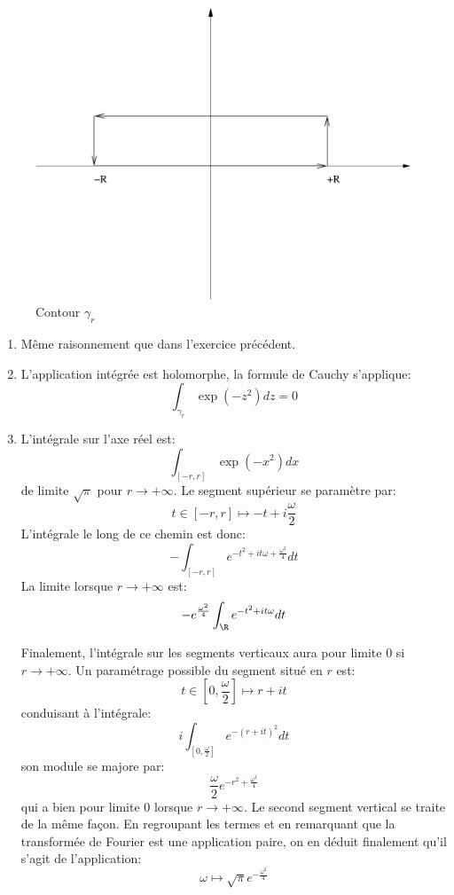  \begin{figure}[ht]
\includegraphics[scale=0.3]{contour_gauss.pdf}
\caption{Contour $\gamma_r$}\label{fig:contour3}
\end{figure}
\begin{enumerate}
 \item Même raisonnement que dans l'exercice précédent.
\item L'application intégrée est holomorphe, la formule de Cauchy s'applique:
\[
  \int_{\gamma_r} \exp(-z^2)dz = 0
  \]
\item L'intégrale sur l'axe réel est:
\[
 \int_{[-r,r]} \exp(-x^2) dx 
\]
de limite $\sqrt{\pi}$ pour $r \to +\infty$. Le segment supérieur se paramètre
par:
\[
 t \in [-r,r] \mapsto -t+i \frac{\omega}{2}
\]
L'intégrale le long de ce chemin est donc:
\[
 - \int_{[-r,r]} e^{-t^2 + i t \omega + \frac{\omega^2}{4}} dt
\]
La limite lorsque $r\to +\infty$ est:
\[
- e^{\frac{\omega^2}{4}} \int_\R  e^{-t^2 + i t \omega} dt 
\]

Finalement, l'intégrale sur les segments verticaux aura pour limite $0$ si $r
\to +\infty$. Un paramétrage possible du segment situé en $r$ est:
\[
t \in [0, \frac{\omega}{2}] \mapsto r + it 
\]
conduisant à l'intégrale:
\[
 i \int_{[0, \frac{\omega}{2}]} e^{-(r+it)^2} dt 
\]
son module se majore par:
\[
 \frac{\omega}{2}e^{-r^2 + \frac{\omega^2}{4}}
\]
qui a bien pour limite $0$ lorsque $r \to +\infty$. Le second segment vertical
se traite de la même façon. En regroupant les termes et en remarquant que la
transformée de Fourier est une application paire, on en déduit finalement
qu'il s'agit de l'application:
\[
 \omega \mapsto \sqrt{\pi} e^{-\frac{\omega^2}{4}}
\]
\end{enumerate}